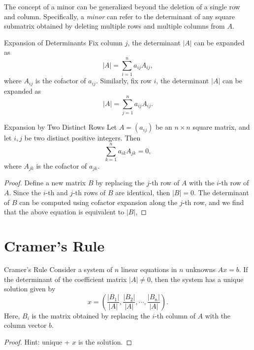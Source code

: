 \begin{note}
  The concept of a minor can be generalized beyond the deletion of a single row
  and column.
  Specifically, a \emph{minor} can refer to the determinant of any square submatrix
  obtained by deleting multiple rows and multiple columns from $A$.
\end{note}

\begin{proposition}{Expansion of Determinants}{}
  Fix column $j$, the determinant $|A|$ can be expanded as
  \begin{equation}
    |A| = \sum\limits_{i = 1}^n a_{ij} A_{ij},
  \end{equation}
  where $A_{ij}$ is the cofactor of $a_{ij}$.
  Similarly, fix row $i$, the determinant $|A|$ can be expanded as
  \begin{equation}
    |A| = \sum\limits_{j = 1}^n a_{ij} A_{ij}.
  \end{equation}
\end{proposition}

\begin{proposition}{Expansion by Two Distinct Rows}{}
  Let $A = (a_{ij})$ be an $n \times n$ square matrix,
  and let $i, j$ be two distinct positive integers.
  Then
  \begin{equation}
    \sum\limits_{k = 1}^n a_{ik} A_{jk} = 0,
  \end{equation}
  where $A_{jk}$ is the cofactor of $a_{jk}$.
\end{proposition}

\begin{proof}
  Define a new matrix $B$ by replacing the $j$-th row of $A$ with the
  $i$-th row of $A$.
  Since the $i$-th and $j$-th rows of $B$ are identical, then $|B| = 0$.
  The determinant of $B$ can be computed using cofactor expansion along the
  $j$-th row, and we find that the above equation is equivalent to $|B|$,
\end{proof}

\section{Cramer's Rule}

\begin{theorem}{Cramer's Rule}{}
  Consider a system of $n$ linear equations in $n$ unknowns $Ax = b$.
  If the determinant of the coefficient matrix $|A| \neq 0$,
  then the system has a unique solution given by
  \begin{equation}
    x = \left( \frac{|B_1|}{|A|}, \frac{|B_2|}{|A|}, \cdots, \frac{|B_n|}{|A|} \right).
  \end{equation}
  Here, $B_i$ is the matrix obtained by replacing the $i$-th column of $A$
  with the column vector $b$.
\end{theorem}

\begin{proof}
  Hint: unique + $x$ is the solution.
\end{proof}









